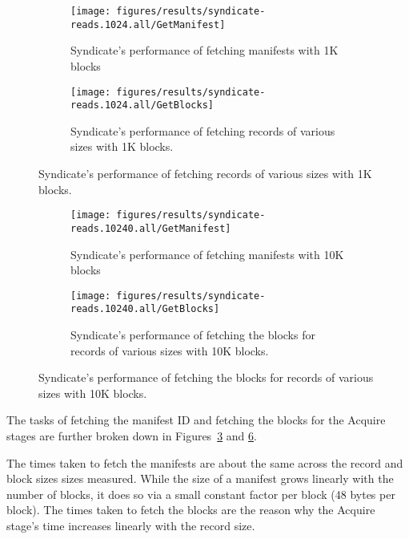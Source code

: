 \begin{figure}[htp!]
   \centering
   \caption{Box-and-whiskers plots of Syndicate's Acquire stage performance with 1K
   blocks.}
   \begin{subfigure}[b]{.8\textwidth}
      \texttt{[image: figures/results/syndicate-reads.1024.all/GetManifest]}
      \label{fig:syndicate-getmanifest-1k}
      \caption{Syndicate's performance of fetching manifests with 1K blocks}
   \end{subfigure}
   \begin{subfigure}[b]{.8\textwidth}
      \texttt{[image: figures/results/syndicate-reads.1024.all/GetBlocks]}
      \label{fig:syndicate-getblocks-1k}
      \caption{Syndicate's performance of fetching records of various sizes with
      1K blocks.}
   \end{subfigure}
   \label{fig:syndicate-acquire-breakdown-1K}
\end{figure}

\begin{figure}[htp!]
   \centering
   \caption{Box-and-whiskers plots of Syndicate's Acquire stage performance with
   10K blocks.}
   \begin{subfigure}[b]{.8\textwidth}
      \texttt{[image: figures/results/syndicate-reads.10240.all/GetManifest]}
      \label{fig:syndicate-getmanifest-10k}
      \caption{Syndicate's performance of fetching manifests with 10K blocks}
   \end{subfigure}
   \begin{subfigure}[b]{.8\textwidth}
      \texttt{[image: figures/results/syndicate-reads.10240.all/GetBlocks]}
      \label{fig:syndicate-read-acquire-1k}
      \caption{Syndicate's performance of fetching the blocks for records of various sizes with
      10K blocks.}
   \end{subfigure}
   \label{fig:syndicate-acquire-breakdown-10K}
\end{figure}

The tasks of fetching the manifest ID and fetching
the blocks for the Acquire stages are further broken down in
Figures~\ref{fig:syndicate-acquire-breakdown-1K} and
\ref{fig:syndicate-acquire-breakdown-10K}.

The times taken to fetch the manifests are about the same across the record
and block sizes sizes measured.  While
the size of a manifest grows linearly with the number of blocks, it does so via
a small constant factor per block (48 bytes per block).  The times taken to
fetch the blocks are the reason why the Acquire stage's time increases linearly
with the record size.

